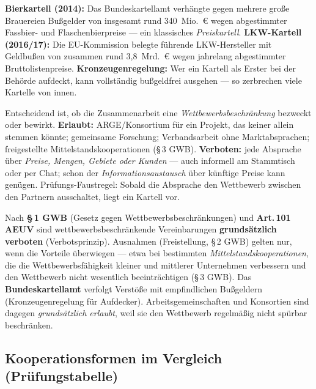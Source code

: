 \documentclass[11pt, a4paper]{article}
\begin{document}
\begin{beispiel}[title={\bfseries Kartelle in der Praxis --- bekannte Fälle}]
\textbf{Bierkartell (2014):} Das Bundeskartellamt verhängte gegen mehrere große
Brauereien Bußgelder von insgesamt rund 340~Mio.~€ wegen abgestimmter
Fassbier- und Flaschenbierpreise --- ein klassisches \emph{Preiskartell}.
\textbf{LKW-Kartell (2016/17):} Die EU-Kommission belegte führende
LKW-Hersteller mit Geldbußen von zusammen rund 3,8~Mrd.~€ wegen jahrelang
abgestimmter Bruttolistenpreise. \textbf{Kronzeugenregelung:} Wer ein Kartell als
Erster bei der Behörde aufdeckt, kann vollständig bußgeldfrei ausgehen --- so
zerbrechen viele Kartelle von innen.
\end{beispiel}

\begin{achtung}[title={\bfseries Abgrenzung: erlaubte Kooperation oder verbotenes Kartell?}]
Entscheidend ist, ob die Zusammenarbeit eine \emph{Wettbewerbsbeschränkung} bezweckt
oder bewirkt. \textbf{Erlaubt:} ARGE/Konsortium für ein Projekt, das keiner allein
stemmen könnte; gemeinsame Forschung; Verbandsarbeit ohne Marktabsprachen;
freigestellte Mittelstandskooperationen (\S\,3 GWB). \textbf{Verboten:} jede Absprache
über \emph{Preise, Mengen, Gebiete oder Kunden} --- auch informell am Stammtisch oder
per Chat; schon der \emph{Informationsaustausch} über künftige Preise kann genügen.
Prüfungs-Faustregel: Sobald die Absprache den Wettbewerb zwischen den Partnern
ausschaltet, liegt ein Kartell vor.
\end{achtung}

\begin{merksatz}[title={\bfseries Kartellrechtliche Einordnung (Verweis: VWL-Lektion 2)}]
Nach \textbf{\S\,1 GWB} (Gesetz gegen Wettbewerbsbeschränkungen) und
\textbf{Art.\,101 AEUV} sind wettbewerbsbeschränkende Vereinbarungen
\textbf{grundsätzlich verboten} (Verbotsprinzip). Ausnahmen (Freistellung, \S\,2 GWB)
gelten nur, wenn die Vorteile überwiegen --- etwa bei bestimmten
\emph{Mittelstandskooperationen}, die die Wettbewerbsfähigkeit kleiner und mittlerer
Unternehmen verbessern und den Wettbewerb nicht wesentlich beeinträchtigen (\S\,3 GWB). Das
\textbf{Bundeskartellamt} verfolgt Verstöße mit empfindlichen Bußgeldern
(Kronzeugenregelung für Aufdecker). Arbeitsgemeinschaften und Konsortien sind dagegen
\emph{grundsätzlich erlaubt}, weil sie den Wettbewerb regelmäßig nicht spürbar
beschränken.
\end{merksatz}

\subsection{Kooperationsformen im Vergleich (Prüfungstabelle)}
\end{document}
